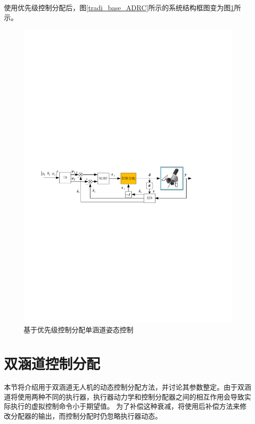 使用优先级控制分配后，图\ref{tradi_base_ADRC}所示的系统结构框图变为图\ref{prio_base_ADRC}所示。
\begin{figure}[htbp]
	\centering	
	\includegraphics[scale=1]{Fig/prio_base_ADRC.pdf}
	\caption{\label{prio_base_ADRC}基于优先级控制分配单涵道姿态控制}
\end{figure}
\section{双涵道控制分配}
本节将介绍用于双涵道无人机的动态控制分配方法，并讨论其参数整定。由于双涵道将使用两种不同的执行器，执行器动力学和控制分配器之间的相互作用会导致实际执行的虚拟控制命令小于期望值。 为了补偿这种衰减，将使用后补偿方法来修改分配器的输出，而控制分配时仍忽略执行器动态。
